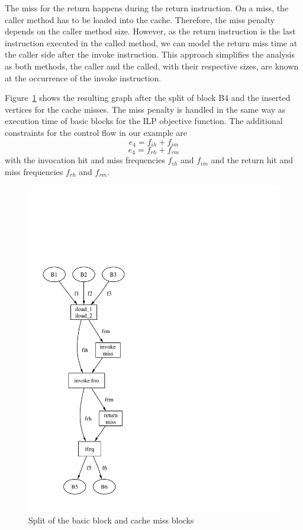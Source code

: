 The miss for the return happens during the return instruction. On a
miss, the caller method has to be loaded into the cache. Therefore,
the miss penalty depends on the caller method size. However, as the
return instruction is the last instruction executed in the called
method, we can model the return miss time at the caller side after
the invoke instruction. This approach simplifies the analysis as both
methods, the caller and the called, with their respective sizes, are
known at the occurrence of the invoke instruction.

Figure~\ref{fig:cache:split} shows the resulting graph after the
split of block B4 and the inserted vertices for the cache misses. The
miss penalty is handled in the same way as execution time of basic
blocks for the ILP objective function. The additional constraints for
the control flow in our example are
\begin{equation*}
    e_4 = f_{ih} + f_{im}
\end{equation*}
\begin{equation*}
    e_4 = f_{rh} + f_{rm}
\end{equation*}
with the invocation hit and miss frequencies $f_{ih}$ and $f_{im}$
and the return hit and miss frequencies $f_{rh}$ and $f_{rm}$.

\begin{figure}
    \centering
    \includegraphics[scale=0.5]{wcet/cache_split}
    \caption{Split of the basic block and cache miss blocks}
    \label{fig:cache:split}
\end{figure}

